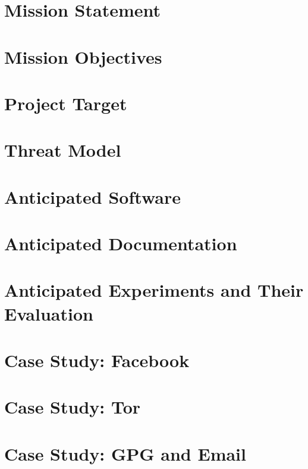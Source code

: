 \chapter{Mission Statement}


\chapter{Mission Objectives}


\chapter{Project Target}


\chapter{Threat Model}


\chapter{Anticipated Software}


\chapter{Anticipated Documentation}


\chapter{Anticipated Experiments and Their Evaluation}


\chapter{Case Study: Facebook}


\chapter{Case Study: Tor}


\chapter{Case Study: GPG and Email}


